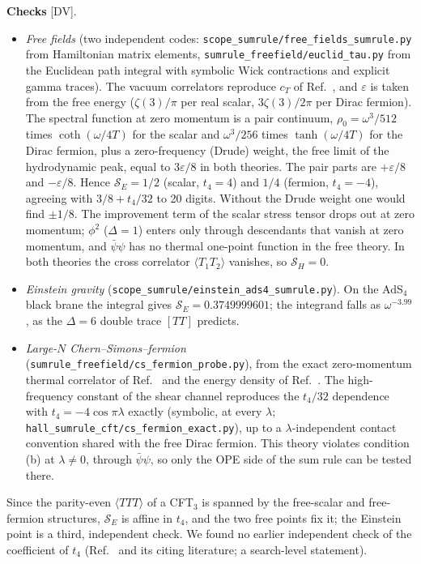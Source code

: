 \textbf{Checks} [DV].
\begin{itemize}
\item\emph{Free fields} (two independent codes: \texttt{scope\_sumrule/free\_fields\_sumrule.py} from Hamiltonian matrix
elements, \texttt{sumrule\_freefield/euclid\_tau.py} from the Euclidean path integral with symbolic Wick contractions and
explicit gamma traces). The vacuum correlators reproduce $c_T$ of Ref.~\cite{OsbornPetkou}, and $\varepsilon$ is taken from the
free energy ($\zeta(3)/\pi$ per real scalar, $3\zeta(3)/2\pi$ per Dirac fermion). The spectral function at zero momentum is a
pair continuum, $\rho_0=\omega^3/512$ times $\coth(\omega/4T)$ for the scalar and $\omega^3/256$ times $\tanh(\omega/4T)$ for the
Dirac fermion, plus a zero-frequency (Drude) weight, the free limit of the hydrodynamic peak, equal to $3\varepsilon/8$ in both
theories. The pair parts are $+\varepsilon/8$ and $-\varepsilon/8$. Hence $\mathcal S_E=1/2$ (scalar, $t_4=4$) and $1/4$
(fermion, $t_4=-4$), agreeing with $3/8+t_4/32$ to 20 digits. Without the Drude weight one would find $\pm1/8$. The improvement
term of the scalar stress tensor drops out at zero momentum; $\phi^2$ ($\Delta=1$) enters only through descendants that vanish at
zero momentum, and $\bar\psi\psi$ has no thermal one-point function in the free theory. In both theories the cross correlator
$\langle T_1T_2\rangle$ vanishes, so $\mathcal S_H=0$.
\item\emph{Einstein gravity} (\texttt{scope\_sumrule/einstein\_ads4\_sumrule.py}). On the AdS$_4$ black brane the integral gives
$\mathcal S_E=0.3749999601$; the integrand falls as $\omega^{-3.99}$, as the $\Delta=6$ double trace $[TT]$ predicts.
\item\emph{Large-$N$ Chern--Simons--fermion} (\texttt{sumrule\_freefield/cs\_fermion\_probe.py}), from the exact zero-momentum
thermal correlator of Ref.~\cite{Ghosh:2019sqf} and the energy density of Ref.~\cite{Aharony:2012ns}. The high-frequency constant
of the shear channel reproduces the $t_4/32$ dependence with $t_4=-4\cos\pi\lambda$ exactly (symbolic, at every $\lambda$; \texttt{hall\_sumrule\_cft/cs\_fermion\_exact.py}), up to a $\lambda$-independent
contact convention shared with the free Dirac fermion. This theory violates condition (b) at $\lambda\ne0$, through
$\bar\psi\psi$, so only the OPE side of the sum rule can be tested there.
\end{itemize}
Since the parity-even $\langle TTT\rangle$ of a CFT$_3$ is spanned by the free-scalar and free-fermion structures, $\mathcal S_E$
is affine in $t_4$, and the two free points fix it; the Einstein point is a third, independent check. We found no earlier independent check of the coefficient of $t_4$ (Ref.~\cite{Chowdhury:2016hjy} and its citing literature;
a search-level statement).

